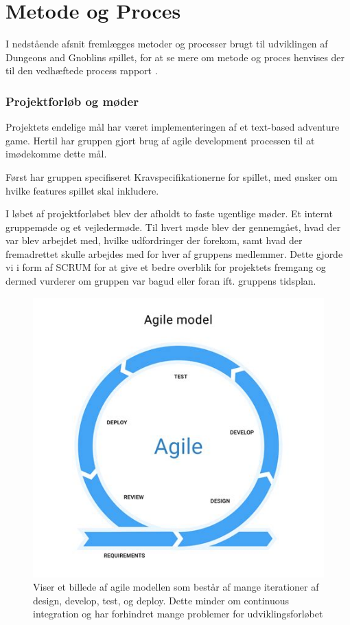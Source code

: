 \section{Metode og Proces}
I nedstående afsnit fremlægges metoder og processer brugt til udviklingen af
Dungeons and Gnoblins spillet, for at se mere om metode og proces henvises der til den vedhæftede process rapport \parencite[Section 1][]{ProcessMetode}.

\subsubsection{Projektforløb og møder}
Projektets endelige mål har været implementeringen af et text-based adventure game.
Hertil har gruppen gjort brug af agile development processen til at imødekomme dette mål.

Først har gruppen specifiseret Kravspecifikationerne for spillet, med ønsker om
hvilke features spillet skal inkludere.

I løbet af projektforløbet blev der afholdt to faste ugentlige møder. Et internt gruppemøde og et vejledermøde. Til hvert møde blev der gennemgået, hvad der var blev arbejdet med,
hvilke udfordringer der forekom, samt hvad der fremadrettet skulle arbejdes med for hver af gruppens medlemmer. 
Dette gjorde vi i form af SCRUM for at give et bedre overblik for projektets fremgang og dermed vurderer om gruppen var bagud eller foran ift. gruppens tidsplan.

\begin{figure}[H]
  \centering
  \includegraphics[scale=.5]{02-Body/Images/Agile.png}
  \caption{Viser et billede af agile modellen som består af mange iterationer
           af design, develop, test, og deploy. Dette minder om continuous integration
           og har forhindret mange problemer for udviklingsforløbet}
  \label{fig:Agile}
\end{figure}

